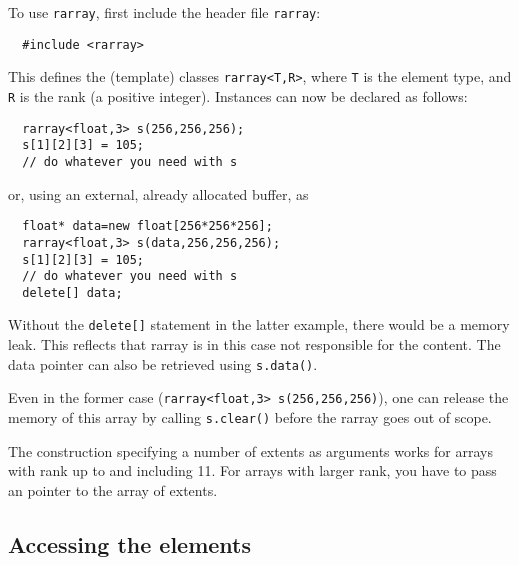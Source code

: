 \documentclass[11pt,twoside]{article}
\begin{document}
To use \texttt{rarray}, first include the header file \texttt{rarray}:
\begin{framed}\vspace{-14pt}%
\begin{verbatim}
  #include <rarray>
\end{verbatim}%
\vspace{-14pt}
\end{framed}
This defines the (template) classes \texttt{rarray{\tt<}T,R{\tt>}}, where
\texttt T is the element type, and \texttt R is the
rank (a positive integer).  Instances can now be
declared as follows:
\begin{framed}\vspace{-18pt}%
\begin{verbatim}
  rarray<float,3> s(256,256,256);
  s[1][2][3] = 105;
  // do whatever you need with s
\end{verbatim}%
\vspace{-14pt}
\end{framed}
\noindent
or, using an external, already allocated buffer, as
\begin{framed}\vspace{-18pt}%
\begin{verbatim}
  float* data=new float[256*256*256];  
  rarray<float,3> s(data,256,256,256);
  s[1][2][3] = 105;
  // do whatever you need with s
  delete[] data;
\end{verbatim}%
\vspace{-14pt}
\end{framed}
Without the \texttt{delete[]} statement in the latter example, there would be a memory leak. This reflects that rarray is in this case not responsible
for the content. The data pointer can also be retrieved using
\texttt{s.data()}. 

Even in the former case (\texttt{rarray<float,3> s(256,256,256)}), one can release the memory of this array by calling \texttt{s.clear()} before the rarray goes out of scope.

The construction specifying a number of extents as arguments works for arrays with rank up to and including 11. For arrays with larger rank, you have to pass an pointer to the array of extents.

\subsection{Accessing the elements}
\end{document}
